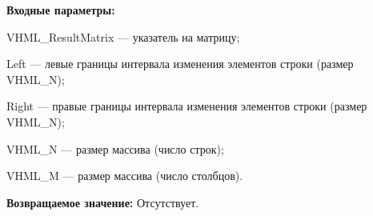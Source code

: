 \textbf{Входные параметры:}

 VHML\_ResultMatrix --- указатель на матрицу;
 
 Left --- левые границы интервала изменения элементов строки (размер VHML\_N);
 
 Right --- правые границы интервала изменения элементов строки (размер VHML\_N);
 
 VHML\_N --- размер массива (число строк);
 
 VHML\_M --- размер массива (число столбцов).

\textbf{Возвращаемое значение:}
Отсутствует.